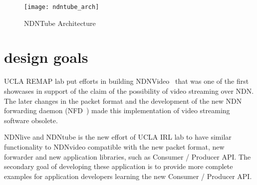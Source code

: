 
\begin{figure*}[htbp]
  \centering
  \texttt{[image: ndntube\_arch]}
  \caption{NDNTube Architecture}
  \label{fig:ndntube_arch}
\end{figure*}

\section{design goals} %
\label{sec:design_goals}
UCLA REMAP lab put efforts in building NDNVideo~\cite{ndnvideo} that was one of the first showcases in support of the claim of the possibility of video streaming over NDN. The later changes in the packet format and the development of the new NDN forwarding daemon (NFD~\cite{nfd-guide}) made this implementation of video streaming software obsolete. 

NDNlive and NDNtube is the new effort of UCLA IRL lab to have similar functionality to NDNvideo compatible with the new packet format, new forwarder and new application libraries, such as Consumer / Producer API. The secondary goal of developing these application is to provide more complete examples for application developers learning the new Consumer / Producer API.


